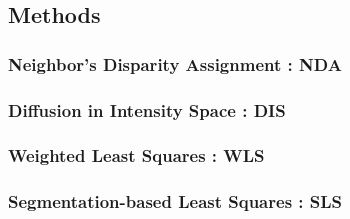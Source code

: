 \subsection{Methods}
\subsubsection{Neighbor's Disparity Assignment : NDA}

\subsubsection{Diffusion in Intensity Space : DIS}


\subsubsection{Weighted Least Squares : WLS}

 
\subsubsection{Segmentation-based Least Squares : SLS}
